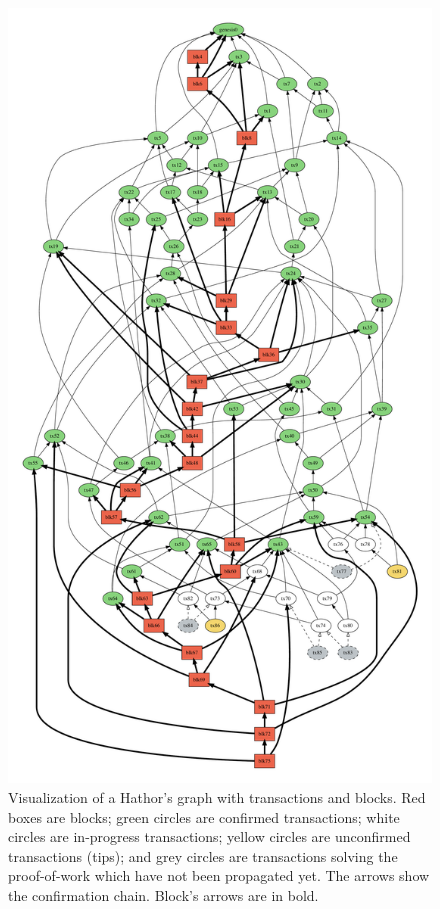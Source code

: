 \begin{figure}[!htb]
\centering\includegraphics[width=\textwidth]{./images01/sim/hathor-2.pdf}
\caption{Visualization of a Hathor's graph with transactions and blocks. Red boxes are blocks; green circles are confirmed transactions; white circles are in-progress transactions; yellow circles are unconfirmed transactions (tips); and grey circles are transactions solving the proof-of-work which have not been propagated yet. The arrows show the confirmation chain. Block's arrows are in bold. \label{fig:hathor-dag-big}}
\end{figure}


